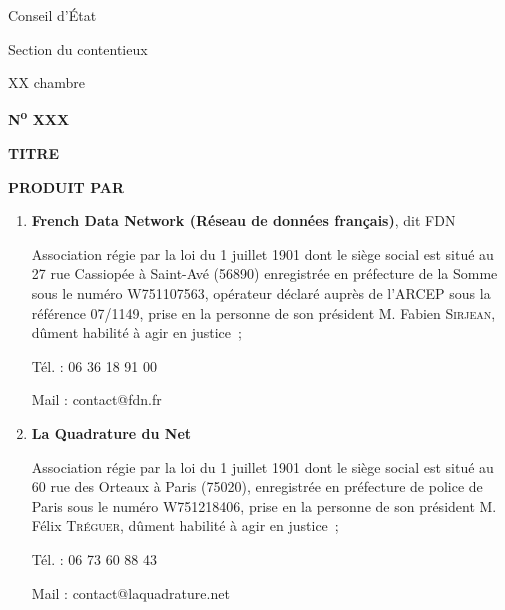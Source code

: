 \begin{titlepage}
\newenvironment{marges}[2]{
\begin{list}{}{\setlength{\leftmargin}{#1}%
\setlength{\rightmargin}{#2}}\item}
{\end{list}}
\pagestyle{empty}
\begin{marges}{-0.6in}{-0.6in}
\begin{minipage}{5cm}\centering
Conseil d'État\par
Section du contentieux\par
XX\ieme{} chambre\par
\textbf{N\textsuperscript{o} XXX}
\end{minipage}
\vskip 1.2cm
\begin{center}\LARGE\bfseries
  TITRE
\end{center}
\vskip 1cm

\textbf{PRODUIT PAR}

\begin{enumerate}
\item \textbf{French Data Network (Réseau de données français)}, dit FDN

Association régie par la loi du 1\ier{} juillet 1901
dont  le  siège  social  est   situé   au 
27 rue Cassiopée à Saint-Avé (56890)
enregistrée en préfecture de la Somme sous le numéro W751107563,
opérateur déclaré auprès de l’ARCEP sous la référence 07/1149,
prise en la personne de son président M. Fabien \textsc{Sirjean}, dûment habilité à agir en justice~;

Tél. : 06 36 18 91 00

Mail : contact@fdn.fr

\item \textbf{La  Quadrature  du  Net}

Association régie par la loi du 1\ier{} juillet 1901
dont  le  siège  social  est   situé   au   
60   rue   des   Orteaux   à   Paris (75020), 
enregistrée en préfecture de police de Paris sous le numéro W751218406,
prise en la personne de 
son président M. Félix \textsc{Tréguer},
dûment habilité à agir en justice~;

Tél. : 06 73 60 88 43

Mail : contact@laquadrature.net


\end{enumerate}
\end{marges}
\end{titlepage}
